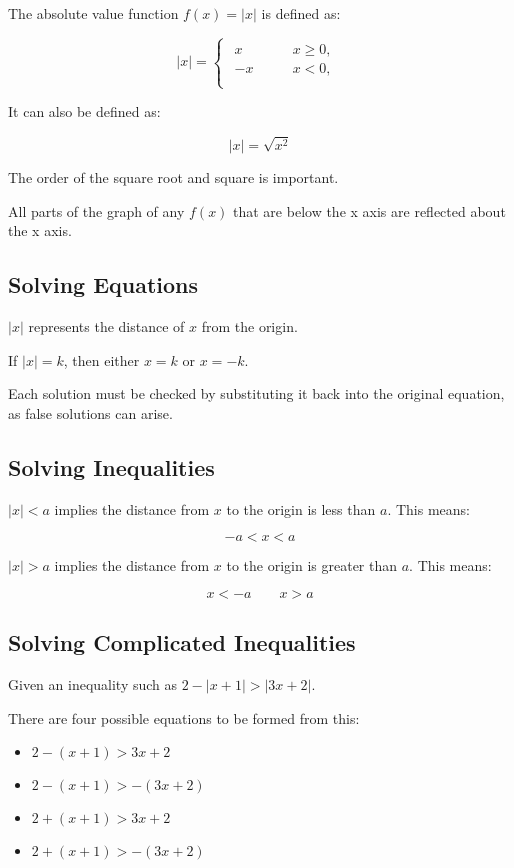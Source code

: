 \documentclass[a4paper,11pt]{article}
\begin{document}
The absolute value function $f(x) = \lvert x \rvert$ is defined as:

$$
\lvert x \rvert = \begin{cases}
\begin{aligned}
	x \qquad & x \geq 0, \\
	-x \qquad & x < 0, \\
\end{aligned}
\end{cases}
$$

It can also be defined as:

$$
\lvert x \rvert = \sqrt{x^2}
$$

The order of the square root and square is important.

All parts of the graph of any $f(x)$ that are below the x axis are reflected
about the x axis.


\subsection{Solving Equations}

$\lvert x \rvert$ represents the distance of $x$ from the origin.

If $\lvert x \rvert = k$, then either $x = k$ or $x = -k$.

Each solution must be checked by substituting it back into the original
equation, as false solutions can arise.


\subsection{Solving Inequalities}

$\lvert x \rvert < a$ implies the distance from $x$ to the origin is less than
$a$. This means:

$$
-a < x < a
$$

$\lvert x \rvert > a$ implies the distance from $x$ to the origin is greater
than $a$. This means:

$$
x < -a \qquad x > a
$$


\subsection{Solving Complicated Inequalities}

Given an inequality such as $2 - \lvert x + 1 \rvert > \lvert 3x + 2 \rvert$.

There are four possible equations to be formed from this:

\begin{itemize}
\item $2 - (x + 1) > 3x + 2$
\item $2 - (x + 1) > -(3x + 2)$
\item $2 + (x + 1) > 3x + 2$
\item $2 + (x + 1) > -(3x + 2)$
\end{itemize}
\end{document}
